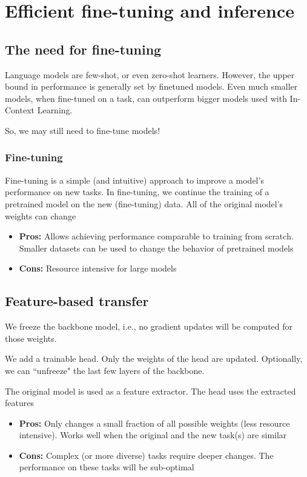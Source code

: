 \chapter{Efficient fine-tuning and inference}

\section{The need for fine-tuning}

Language models are few-shot, or even zero-shot learners.
However, the upper bound in performance is generally set by finetuned models.
Even much smaller models, when fine-tuned on a task, can outperform bigger
models used with In-Context Learning.

So, we may still need to fine-tune models!

\subsection{Fine-tuning}

Fine-tuning is a simple (and intuitive) approach to improve a
model's performance on new tasks. In fine-tuning, we continue the training of a pretrained model on
the new (fine-tuning) data. All of the original model's weights can change

\begin{itemize}
  \item \textbf{Pros:} Allows achieving performance comparable to training from scratch. Smaller datasets can be used to change the behavior of pretrained models
  \item \textbf{Cons:} Resource intensive for large models
\end{itemize}

\section{Feature-based transfer}
We freeze the backbone model,  i.e., no gradient updates will be computed for those weights.

We add a trainable head. Only the weights of the head are updated. Optionally, we can “unfreeze" the last few layers of the backbone.

The original model is used as a feature extractor. The head uses the extracted features

\begin{itemize}
  \item \textbf{Pros:} Only changes a small fraction of all possible weights (less resource intensive). Works well when the original and the new task(s) are similar
  \item \textbf{Cons:} Complex (or more diverse) tasks require deeper changes. The performance on these tasks will be sub-optimal

\end{itemize}

